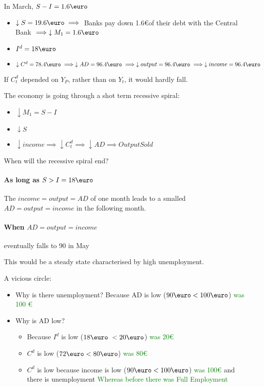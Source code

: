 \documentclass{report}
\begin{document}
In March, $S-I=1.6\text{\euro}$
\begin{itemize}
    \item $\downarrow S=19.6\text{\euro} \implies$ Banks pay down 1.6\euro of their debt with the Central Bank $\implies \downarrow M_1=1.6\text{\euro}$
    \item $I^d=18\text{\euro}$
    \item $\downarrow C^d=78.4\text{\euro} \implies \downarrow AD=96.4\text{\euro} \implies \downarrow output=96.4\text{\euro}\implies \downarrow income=96.4\text{\euro}$
\end{itemize}

If $C_t^d$ depended on $Y_P$, rather than on $Y_t$, it would hardly fall.

The economy is going through a shot term recessive spiral: 
\begin{itemize}
    \item $\downarrow M_1=S-I$
    \item $\downarrow S$
    \item $\downarrow income \implies \downarrow C_t^d \implies \downarrow AD \implies Output Sold$
\end{itemize}

When will the recessive spiral end? 

\paragraph{As long as $S>I=18\text{\euro}$}

The $income=output=AD$ of one month leads to a smalled $AD=output=income$ in the following month. 

\paragraph{When $AD=output=income$} 

eventually falls to 90\text{\euro} in May


This would be a steady state characterised by high unemployment. 

A vicious circle: 
\begin{itemize}
    \item Why is there unemployment? Because AD is low ($90\text{\euro}<100\text{\euro}$) \textcolor{green}{was 100 \euro}
    \item Why is AD low? 
    \begin{itemize}
        \item Because $I^d$ is low ($18\text{\euro}\ < 20\text{\euro}$) \textcolor{green}{was 20\euro}
        \item $C^d$ is low ($72\text{\euro}<80\text{\euro}$) \textcolor{green}{was 80\euro}
        \item $C^d$ is low because income is low ($90\text{\euro}<100\text{\euro}$) \textcolor{green}{was 100\euro} and there is unemployment \textcolor{green}{Whereas before there was Full Employment}
    \end{itemize}
\end{itemize}
\end{document}
